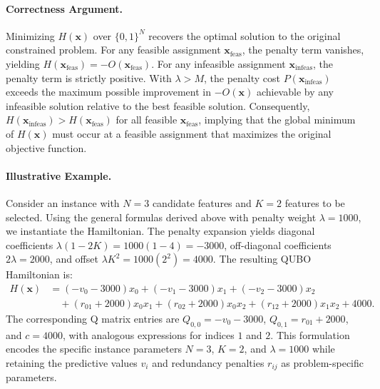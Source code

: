 \documentclass[12pt]{article}
\begin{document}
\paragraph{Correctness Argument.}
Minimizing $H(\mathbf{x})$ over $\{0,1\}^N$ recovers the optimal solution to the original constrained problem. For any feasible assignment $\mathbf{x}_{\text{feas}}$, the penalty term vanishes, yielding $H(\mathbf{x}_{\text{feas}}) = -O(\mathbf{x}_{\text{feas}})$. For any infeasible assignment $\mathbf{x}_{\text{infeas}}$, the penalty term is strictly positive. With $\lambda > M$, the penalty cost $P(\mathbf{x}_{\text{infeas}})$ exceeds the maximum possible improvement in $-O(\mathbf{x})$ achievable by any infeasible solution relative to the best feasible solution. Consequently, $H(\mathbf{x}_{\text{infeas}}) > H(\mathbf{x}_{\text{feas}})$ for all feasible $\mathbf{x}_{\text{feas}}$, implying that the global minimum of $H(\mathbf{x})$ must occur at a feasible assignment that maximizes the original objective function.

\paragraph{Illustrative Example.}
Consider an instance with $N=3$ candidate features and $K=2$ features to be selected. Using the general formulas derived above with penalty weight $\lambda = 1000$, we instantiate the Hamiltonian. The penalty expansion yields diagonal coefficients $\lambda(1-2K) = 1000(1-4) = -3000$, off-diagonal coefficients $2\lambda = 2000$, and offset $\lambda K^2 = 1000(2^2) = 4000$. The resulting QUBO Hamiltonian is:
\begin{align}
    H(\mathbf{x}) &= (-v_0 - 3000)x_0 + (-v_1 - 3000)x_1 + (-v_2 - 3000)x_2 \nonumber \\
    &\quad + (r_{01} + 2000)x_0 x_1 + (r_{02} + 2000)x_0 x_2 + (r_{12} + 2000)x_1 x_2 + 4000.
\end{align}
The corresponding Q matrix entries are $Q_{0,0} = -v_0 - 3000$, $Q_{0,1} = r_{01} + 2000$, and $c = 4000$, with analogous expressions for indices $1$ and $2$. This formulation encodes the specific instance parameters $N=3$, $K=2$, and $\lambda=1000$ while retaining the predictive values $v_i$ and redundancy penalties $r_{ij}$ as problem-specific parameters.
\end{document}
